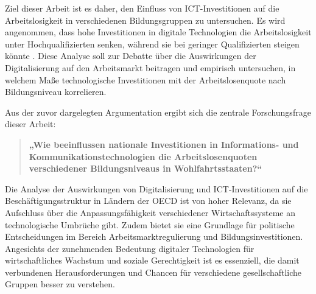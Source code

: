 Ziel dieser Arbeit ist es daher, den Einfluss von \ac{ICT}-Investitionen auf die 
Arbeitslosigkeit in verschiedenen Bildungsgruppen zu untersuchen. Es wird angenommen, 
dass hohe Investitionen in digitale Technologien die Arbeitslosigkeit unter 
Hochqualifizierten senken, während sie bei geringer Qualifizierten steigen könnte 
\parencite[vgl.][S. 1045]{acemoglu2011skills}. Diese Analyse soll zur Debatte über die 
Auswirkungen der Digitalisierung auf den Arbeitsmarkt beitragen und empirisch untersuchen, 
in welchem Maße technologische Investitionen mit der Arbeitslosenquote nach 
Bildungsniveau korrelieren.

Aus der zuvor dargelegten Argumentation ergibt sich die zentrale Forschungsfrage 
dieser Arbeit:

\begin{quote} 
    \textbf{„Wie beeinflussen nationale Investitionen in Informations- und 
    Kommunikationstechnologien die Arbeitslosenquoten verschiedener Bildungsniveaus 
    in Wohlfahrtsstaaten?“}
\end{quote}

Die Analyse der Auswirkungen von Digitalisierung und \ac{ICT}-Investitionen auf die 
Beschäftigungsstruktur in Ländern der \ac{OECD} ist von hoher Relevanz, da sie Aufschluss 
über die Anpassungsfähigkeit verschiedener Wirtschaftssysteme an technologische 
Umbrüche gibt. Zudem bietet sie eine Grundlage für politische Entscheidungen im 
Bereich Arbeitsmarktregulierung und Bildungsinvestitionen. Angesichts der zunehmenden 
Bedeutung digitaler Technologien für wirtschaftliches Wachstum und soziale 
Gerechtigkeit ist es essenziell, die damit verbundenen Herausforderungen und Chancen 
für verschiedene gesellschaftliche Gruppen besser zu verstehen.
